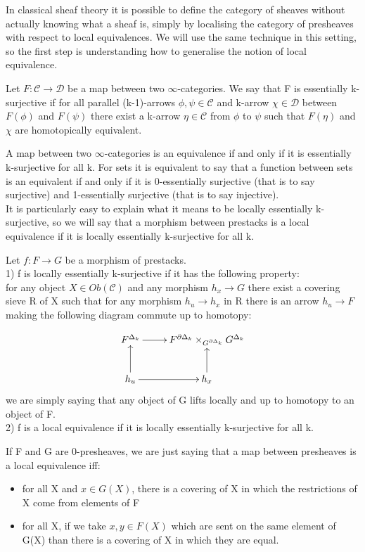 \begin{refsection}
In classical sheaf theory it is possible to define the category of sheaves without actually knowing what a sheaf is, simply by localising the category of
presheaves with respect to local equivalences. We will use the same technique in this setting, so the first step is understanding how to generalise the
notion of local equivalence.\\
\begin{defin}
Let $F:\mathcal C\to\mathcal D$ be a map between two $\infty$-categories. We say that F is essentially k-surjective if for all parallel (k-1)-arrows $\phi,\psi\in \mathcal C$ and k-arrow $\chi \in \mathcal D$
between $F(\phi)$ and $F(\psi)$ there exist a k-arrow $\eta\in\mathcal C$ from $\phi$ to $\psi$ such that $F(\eta)$ and $\chi$ are homotopically equivalent.
\end{defin}
A map between two $\infty$-categories is an equivalence if and only if it is essentially k-surjective for all k. For sets it is equivalent to say that a function
between sets is an equivalent if and only if it is 0-essentially surjective (that is to say surjective) and 1-essentially surjective (that is to say injective).\\
It is particularly easy to explain what it means to be locally essentially k-surjective, so we will say that a morphism between prestacks is a local equivalence
if it is locally essentially k-surjective for all k.

\begin{defin}
Let $f: F\to G$ be a morphism of prestacks.\\
1) f is locally essentially k-surjective if it has the following property:\\
for any object $X\in Ob(\mathcal C)$ and any morphism $h_x\to G$ there exist a covering sieve R of X such that for any morphism $h_u\to h_x$ in R there is an arrow
$h_u\to F$ making the following diagram commute up to homotopy:

\begin{displaymath}
\xymatrix{
F^{\Delta_k} \ar[r] &  F^{\partial\Delta_k}\times_{G^{\partial\Delta_k}}G^{\Delta_k}\\
 h_u \ar[u] \ar[r] & h_x\ar[u]
}
\end{displaymath}
we are simply saying that any object of G lifts locally and up to homotopy to an object of F.\\
2) f is a local equivalence if it is locally essentially k-surjective for all k.
\end{defin}

\begin{rmk}
If F and G are 0-presheaves, we are just saying that a map between presheaves is a local equivalence iff:
\begin{itemize}
 \item for all X and $x\in G(X)$, there is a covering of X in which the restrictions of X come from elements of F
\item for all X, if we take $x,y\in F(X)$ which are sent on the same element of G(X) than there is a covering of X in which they are equal.
\end{itemize}


\end{rmk}
\end{refsection}
